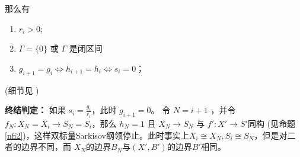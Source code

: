 那么有
\begin{enumerate}
  \item $r_{i}>0$;
  \item  $\Gamma=\{0\} $ 或 $\Gamma$ 是闭区间
  \item $g_{i+1}=g_{i} \Leftrightarrow h_{i+1}=h_{i} \Leftrightarrow s_{i}=0$；
\end{enumerate}
(细节见 \cite[Lemma 4.4]{liuSarkisovProgramGeneralized2021} )

\textbf{终结判定：}
如果 $s_{i}=\frac{g_{i}}{r_{i}}$，此时 $g_{i+1}=0$。 令 $N=i+1$ ，并令$f_{N}:X_{N}=X_{i} \to S_{N}=S_{i}$，那么 $h_{N}=1$ 且 $X_{N}\to S_{N}$ 与 $f':X'\to S'$同构 (见命题 \ref{nfi2})，这样双标量Sarkisov纲领停止。此时事实上$X_{i}\cong X_{N},S_{i}\cong S_{N}$，但是对二者的边界不同，而 $X_{N}$的边界$B_{N}$与$(X',B')$的边界$B'$相同。


